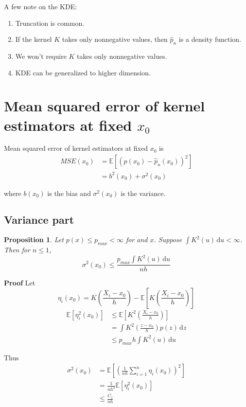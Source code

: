 \documentclass[10pt]{article}
\newtheorem{proposition}[prop]{Proposition}
\newcommand{\Expect}[1]{\mathbb{E}\!\left[#1\right]}
\renewcommand{\hat}{\widehat}
\begin{document}
A few note on the KDE:
\begin{enumerate}
\item Truncation is common. 
\item If the kernel $K$ takes only nonnegative values, then $\hat{p}_n$ is a density function.
\item We won't require $K$ takes only nonnegative values.
\item KDE can be generalized to higher dimension.
\end{enumerate}



\section{Mean squared error of kernel estimators at fixed $x_0$}

Mean squared error of kernel estimators at fixed $x_0$ is
\begin{align}
MSE(x_0) &= \Expect { (p(x_0) - \hat{p}_n(x_0))^2 } \\
&= b^2(x_0) + \sigma^2(x_0)
\end{align}

where $b(x_0)$ is the bias and $\sigma^2(x_0)$ is the variance.


\subsection*{Variance part}

\begin{proposition}
Let $p(x) \le p_{max} < \infty$ for and $x$. Suppose $\int K^2(u) \, \mathrm{d}u < \infty$. Then for $n \le 1$, 
\begin{equation}
\sigma^2(x_0) \le \frac{p_{max} \int K^2(u) \, \mathrm{d}u}{nh}
\end{equation}
\end{proposition}

\textbf{Proof} Let
\begin{equation}
\eta_i (x_0) = K(\frac{X_i - x_0}{h}) - \Expect{K(\frac{X_i - x_0}{h})}
\end{equation}
\begin{align}
\Expect{\eta_i^2(x_0)} &\le \Expect{ K^2(\frac{X_i - x_0}{h}) }\\
&= \int K^2(\frac{z - x_0}{h}) p(z) \, \mathrm{d}z \\
&\le p_{max} h \int K^2(u) \, \mathrm{d}u
\end{align}


Thus
\begin{align}
\sigma^2(x_0) &= \Expect{ (\frac{1}{nh}  \sum_{i=1}^{n} \eta_i (x_0))^2 }\\
& =\frac{1}{nh^2} \Expect{\eta_i^2(x_0)}\\
&\le \frac{C_1}{nh}
\end{align}
\end{document}
